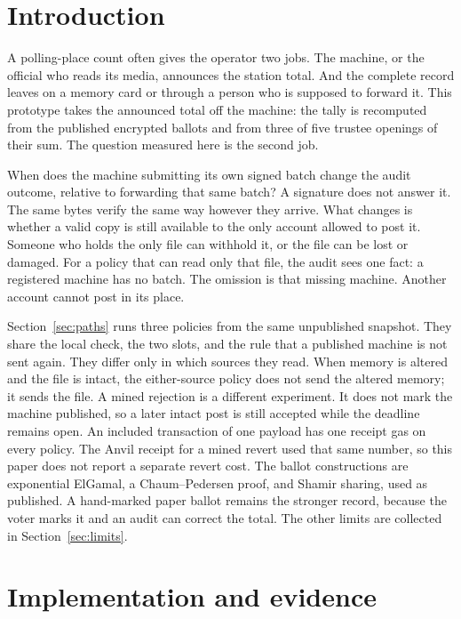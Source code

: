 \documentclass[11pt]{article}
\begin{document}
\section{Introduction}
A polling-place count often gives the operator two jobs. The machine, or the official who reads its media, announces the station total. And the complete record leaves on a memory card or through a person who is supposed to forward it. This prototype takes the announced total off the machine: the tally is recomputed from the published encrypted ballots and from three of five trustee openings of their sum. The question measured here is the second job.

When does the machine submitting its own signed batch change the audit outcome, relative to forwarding that same batch? A signature does not answer it. The same bytes verify the same way however they arrive. What changes is whether a valid copy is still available to the only account allowed to post it. Someone who holds the only file can withhold it, or the file can be lost or damaged. For a policy that can read only that file, the audit sees one fact: a registered machine has no batch. The omission is that missing machine. Another account cannot post in its place.

Section~\ref{sec:paths} runs three policies from the same unpublished snapshot. They share the local check, the two slots, and the rule that a published machine is not sent again. They differ only in which sources they read. When memory is altered and the file is intact, the either-source policy does not send the altered memory; it sends the file. A mined rejection is a different experiment. It does not mark the machine published, so a later intact post is still accepted while the deadline remains open. An included transaction of one payload has one receipt gas on every policy. The Anvil receipt for a mined revert used that same number, so this paper does not report a separate revert cost. The ballot constructions are exponential ElGamal, a Chaum--Pedersen proof, and Shamir sharing, used as published. A hand-marked paper ballot remains the stronger record, because the voter marks it and an audit can correct the total. The other limits are collected in Section~\ref{sec:limits}.

\section{Implementation and evidence}
\end{document}

